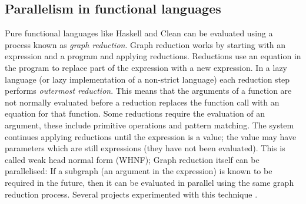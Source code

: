 
\subsection{Parallelism in functional languages}
\label{sec:intro_par_func}


Pure functional languages like Haskell and Clean can be evaluated using a
process known as \emph{graph reduction}.
Graph reduction works by starting with an expression and a program and
applying reductions.
Reductions use an equation in the program to replace part of the expression
with a new expression.
In a lazy language (or lazy implementation of a non-strict language)
each reduction step performs \emph{outermost reduction}.
This means that the arguments of a function are not normally evaluated
before a reduction replaces the function call with an equation for that
function.
Some reductions require the evaluation of an argument,
these include primitive operations and pattern matching.
The system continues applying reductions until the expression is
a value;
the value may have parameters which are still expressions (they have not
been evaluated).
This is called weak head normal form (WHNF);
Graph reduction itself can be parallelised:
If a subgraph (an argument in the expression) is known to be required in the
future,
then it can be evaluated in parallel using the same graph reduction process.
Several projects experimented with this technique
\citep{augustsson:1989:parallel-graph-reduction,burn:1989:parallel-reduction-machine,peyton-jones:1989:parallel-graph-reduction}.

